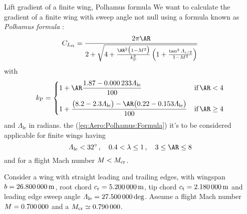 \documentclass[[12pt,twoside]{book}
\begin{document}
%

%
\begin{myExampleX}{Lift gradient of a finite wing, Polhamus formula}{}%
\label{example:Lift:Gradient:Polhamus:Formula}
%
\noindent
We want to calculate the gradient  of a finite wing
with sweep angle not null using a formula known as \emph{Polhamus formula }:
\begin{equation}\label{eq:Aero:Polhamus:Formula}
C_{L_{\mathlarger{\alpha}}} = 
   \frac{ 2\pi\AR
   }{
      2 + \sqrt{ 4+ \frac{\AR^2 \big(1-M^2\big)}{k_\mathrm{P}^2}\left({1+\frac{\tan^2\Lambda_{c/2}}{1-M^2}} \right) }
   }
\end{equation}
with
\begin{equation}\label{eq:Aero:K:Polhamus:Formula}
k_\mathrm{P}={
   \begin{cases}      1+\AR\dfrac{\num[round-precision=2]{1.87}-\num[round-precision=6]{0.000233}\Lambda_\mathrm{le}}{\num[round-precision=0]{100}}
      & \text{if}\, \AR<4
      \\[1em]
      1+\dfrac{
         \big(\num[round-precision=1]{8.2}-\num[round-precision=1]{2.3}\Lambda_\mathrm{le}\big)
         - \AR\big(\num[round-precision=2]{0.22}-\num[round-precision=3]{0.153}\Lambda_\mathrm{le}\big)
         }{\num[round-precision=0]{100}}
      & \text{if}\, \AR \ge 4
   \end{cases}
}
\end{equation}
and $\Lambda_\text{le}$ in radians.
the (\ref{eq:Aero:Polhamus:Formula}) it's to be considered applicable for finite wings
having
\begin{equation}\label{eq:Aero:Limitations:Polhamus:Formula}
\Lambda_\mathrm{le} < \SI[round-precision=0]{32}{\degree}
\,,\quad
\SI[round-precision=1]{0.4}{} < \lambda \le 1
\,,\quad
3 \le \AR \le 8
\end{equation}
and for a flight Mach number $\Mach < \Mach_\mathrm{cr}$.

Consider a wing with straight leading and trailing edges,
with wingspan $b=\SI[round-precision=1]{\mySpanWingMT}{\metre}$,
root chord $c_\mathrm{r}=\SI[round-precision=2]{\myChordRootWingMT}{\metre}$,
tip chord $c_\mathrm{t}=\SI[round-precision=2]{\myChordTipWingMT}{\metre}$
and leading edge sweep angle
$\Lambda_\mathrm{le}=\SI[round-precision=1]{\mySweepLEWingDEG}{\deg}$.
Assume a flight Mach number $\Mach=\SI[round-precision=1]{\myMach}{}$
and a $\Mach_\mathrm{cr}\simeq\SI[round-precision=2]{\myCriticalMachNumberMACWing}{}$.


\end{myExampleX}
\end{document}
